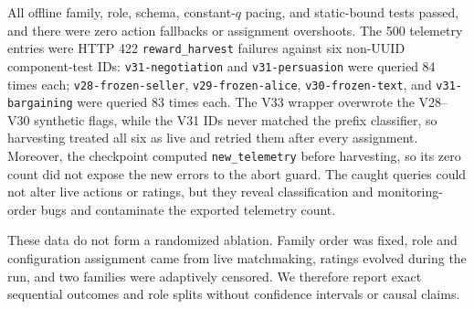 All offline family, role, schema, constant-$q$ pacing, and static-bound tests
passed, and there were zero action fallbacks or assignment overshoots. The 500
telemetry entries were HTTP 422 \texttt{reward\_harvest} failures against six
non-UUID component-test IDs: \texttt{v31-negotiation} and
\texttt{v31-persuasion} were queried 84 times each; \texttt{v28-frozen-seller},
\texttt{v29-frozen-alice}, \texttt{v30-frozen-text}, and
\texttt{v31-bargaining} were queried 83 times each. The V33 wrapper overwrote
the V28--V30 synthetic flags, while the V31 IDs never matched the prefix
classifier, so harvesting treated all six as live and retried them after every
assignment. Moreover, the checkpoint computed
\texttt{new\_telemetry} before harvesting, so its zero count did not expose the
new errors to the abort guard. The caught queries could not alter live actions
or ratings, but they reveal classification and monitoring-order bugs and
contaminate the exported telemetry count.

These data do not form a randomized ablation. Family order was fixed, role and
configuration assignment came from live matchmaking, ratings evolved during
the run, and two families were adaptively censored. We therefore report exact
sequential outcomes and role splits without confidence intervals or causal
claims.
